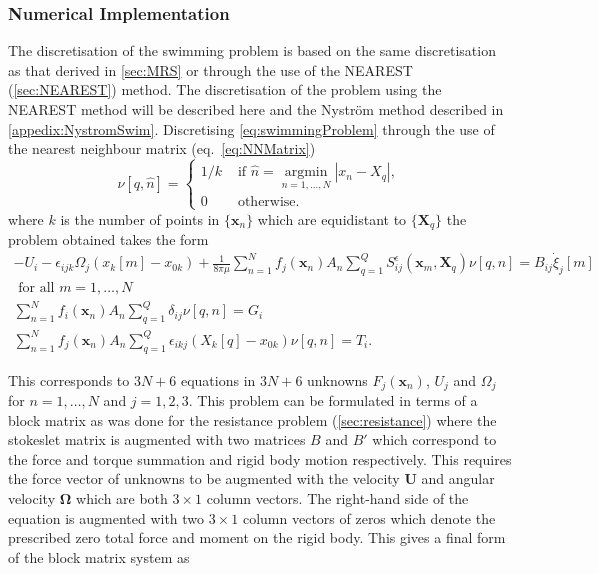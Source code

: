 \subsubsection{Numerical Implementation}
The discretisation of the swimming problem is based on the same discretisation as that derived in \cref{sec:MRS} or through the use of the NEAREST (\cref{sec:NEAREST}) method. The discretisation of the problem using the NEAREST method will be described here and the Nyström method described in \cref{appedix:NystromSwim}. Discretising \cref{eq:swimmingProblem} through the use of the nearest neighbour matrix (eq.~\ref{eq:NNMatrix})
\begin{equation*}
    \nu [q, \hat{n}]= \begin{cases} 1/k & \text { if } \hat{n}=\underset{n=1, \ldots, N}{\operatorname{argmin}}|x_n-X_q| , \\ 0 & \text { otherwise. }\end{cases}
\end{equation*}
where $k$ is the number of points in $\{\bm{x}_n\}$ which are equidistant to $\{\bm{X}_q\}$ the problem obtained takes the form
\begin{gather*}
    -U_{i}-\epsilon_{i j k} \Omega_{j}\left(x_k[{m}]-x_{0 k}\right)+\frac{1}{8 \pi\mu} \sum_{n=1}^N f_{j}(\bm{x}_n) A_n \sum_{q=1}^Q S_{i j}^{\epsilon}(\bm{x}_m, \bm{X}_q)\nu [q, n]  =  B_{i j} \dot{\xi}_{j}[m] \\ \text { for all } m = 1,\dots,N \\
    \sum_{n=1}^N f_{i}(\bm{x}_n) A_n \sum_{q=1}^Q \delta_{i j}\nu [q, n]= G_i \\
    \sum_{n=1}^N f_{j}(\bm{x}_n) A_n \sum_{q=1}^Q \epsilon_{i k j} (X_{k}[q]-x_{0 k}) \nu [q, n] = T_i.
\end{gather*}

This corresponds to $3N + 6$ equations in $3N + 6$ unknowns $F_j(\bm{x}_n)$, $U_j$ and $\Omega_j$ for $n=1,\dots,N$ and $j=1,2,3$.
This problem can be formulated in terms of a block matrix as was done for the resistance problem (\cref{sec:resistance}) where the stokeslet matrix is augmented with two matrices $B$ and $B'$ which correspond to the force and torque summation and rigid body motion respectively. This requires the force vector of unknowns to be augmented with the velocity $\boldsymbol{U}$ and angular velocity $\boldsymbol{\Omega}$ which are both $3 \times 1$ column vectors. The right-hand side of the equation is augmented with two $3 \times 1$ column vectors of zeros which denote the prescribed zero total force and moment on the rigid body. This gives a final form of the block matrix system as

